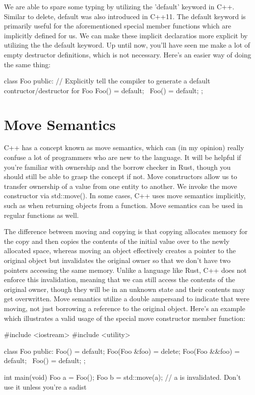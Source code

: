 \documentclass{article}
\begin{document}
We are able to spare some typing by utilizing the 'default' keyword in C++. Similar to delete, default was
also introduced in C++11. The default keyword is primarily useful for the aforementioned special member
functions which are implicitly defined for us. We can make these implicit declaratios more explicit by
utilizing the the default keyword. Up until now, you'll have seen me make a lot of empty destructor
definitions, which is not necessary. Here's an easier way of doing the same thing:

\begin{cpplst}
class Foo
{
public:
    // Explicitly tell the compiler to generate a default contructor/destructor for Foo
    Foo() = default;
    ~Foo() = default;
};
\end{cpplst}

\section{Move Semantics}

C++ has a concept known as move semantics, which can (in my opinion) really confuse a lot of programmers who
are new to the language. It will be helpful if you're familiar with ownership and the borrow checker in Rust,
though you should still be able to grasp the concept if not. Move constructors allow us to transfer
ownership of a value from one entity to another. We invoke the move constructor via std::move(). In some
cases, C++ uses move semantics implicitly, such as when returning objects from a function. Move semantics can
be used in regular functions as well.

The difference between moving and copying is that copying allocates memory for the copy and then copies the
contents of the initial value over to the newly allocated space, whereas moving an object effectively creates
a pointer to the original object but invalidates the original owner so that we don't have two pointers
accessing the same memory. Unlike a language like Rust, C++ does not enforce this invalidation, meaning that
we can still access the contents of the original owner, though they will be in an unknown state and their
contents may get overwritten. Move semantics utilize a double ampersand to indicate that were moving, not just
borrowing a reference to the original object. Here's an example which illustrates a valid usage of the special
move constructor member function:

\begin{cpplst}
#include <iostream>
#include <utility>

class Foo
{
public:
    Foo() = default;
    Foo(Foo &foo) = delete;
    Foo(Foo &&foo) = default;
    ~Foo() = default;
};

int main(void) {
    Foo a = Foo();
    Foo b = std::move(a);
    // a is invalidated. Don't use it unless you're a sadist
}
\end{cpplst}
\end{document}
